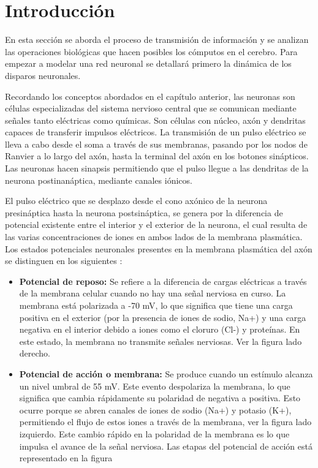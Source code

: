 
\section{Introducción}

En esta sección se aborda el proceso de transmisión de información y se analizan las operaciones biológicas que hacen posibles los cómputos en el cerebro. Para empezar a modelar una red neuronal se detallará primero la dinámica de los disparos neuronales.

Recordando los conceptos abordados en el  capítulo  anterior, las neuronas son células especializadas del sistema nervioso central que se comunican mediante señales tanto eléctricas como químicas.  Son células con núcleo, axón y dendritas capaces de transferir impulsos eléctricos. La transmisión de un pulso eléctrico se lleva a cabo desde el soma a través de sus membranas, pasando por los nodos de Ranvier a lo largo del axón, hasta la terminal del axón en los botones sinápticos. Las neuronas hacen sinapsis  permitiendo que el pulso llegue a las dendritas de la neurona postinanáptica, mediante canales iónicos. \parencite{neurona_A_cerebro}

El pulso eléctrico que se desplazo desde el cono axónico de la neurona presináptica hasta la neurona postsináptica, se genera por la diferencia de potencial existente entre el interior y el exterior de la neurona, el cual resulta de las varias concentraciones de iones en ambos lados de la membrana plasmática. Los estados potenciales neuronales presentes en la membrana plasmática del axón se distinguen en los siguientes \parencite{HH}:

\begin{itemize}
\item \textbf{Potencial de reposo:} Se refiere a la diferencia de cargas eléctricas a través de la membrana celular cuando no hay una señal nerviosa en curso. La membrana está polarizada a -70 mV, lo que significa que tiene una carga positiva en el exterior (por la presencia de iones de sodio, Na+) y una carga negativa en el interior debido a iones como el cloruro (Cl-) y proteínas. En este estado, la membrana no transmite señales nerviosas. Ver la figura  lado derecho.

\item \textbf{Potencial de acción o membrana:}  Se produce cuando un estímulo alcanza un nivel umbral de 55 mV. Este evento despolariza la membrana, lo que significa que cambia rápidamente su polaridad de negativa a positiva. Esto ocurre porque se abren canales de iones de sodio (Na+) y potasio (K+), permitiendo el flujo de estos iones a través de la membrana, ver la figura  lado izquierdo. Este cambio rápido en la polaridad de la membrana es lo que impulsa el avance de la señal nerviosa. Las etapas del potencial de acción está representado en la figura 
\end{itemize}


